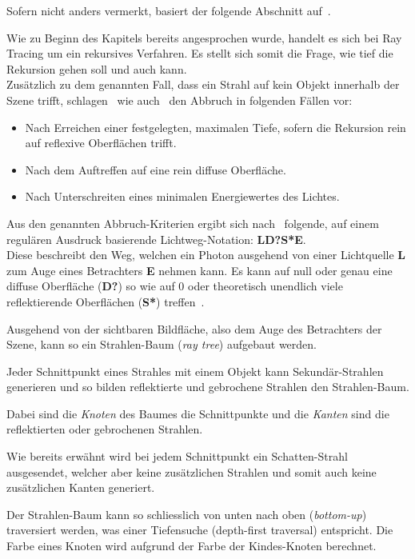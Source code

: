 Sofern nicht anders vermerkt, basiert der folgende Abschnitt
auf~\cite[S. 16 bis 17]{glassner_introduction_1989}.

Wie zu Beginn des Kapitels bereits angesprochen wurde, handelt es sich
bei Ray Tracing um ein rekursives Verfahren. Es stellt sich somit die
Frage, wie tief die Rekursion gehen soll und auch kann.\\
Zusätzlich zu dem genannten Fall, dass ein Strahl auf kein Objekt
innerhalb der Szene trifft, schlagen~\citeauthor{whitted_improved_1980}
wie auch~\citeauthor{glassner_introduction_1989} den Abbruch in
folgenden Fällen vor:
\begin{itemize}
        \item{Nach Erreichen einer festgelegten, maximalen Tiefe},
            sofern die Rekursion rein auf reflexive Oberflächen trifft.
        \item{Nach dem Auftreffen auf eine rein diffuse Oberfläche.}
        \item{Nach Unterschreiten eines minimalen Energiewertes des
                Lichtes.}
\end{itemize}

Aus den genannten Abbruch-Kriterien ergibt sich
nach~\citeauthor{heckbert_adaptive_1990} folgende, auf einem regulären
Ausdruck basierende Lichtweg-Notation: \textbf{LD?S*E}.\\
Diese beschreibt den Weg, welchen ein Photon ausgehend von einer
Lichtquelle \textbf{L} zum Auge eines Betrachters \textbf{E} nehmen
kann. Es kann auf null oder genau eine diffuse Oberfläche (\textbf{D?})
so wie auf 0 oder theoretisch unendlich viele reflektierende Oberflächen
(\textbf{S*}) treffen~\parencite[S. 148]{heckbert_adaptive_1990}.

Ausgehend von der sichtbaren Bildfläche, also dem Auge des Betrachters
der Szene, kann so ein Strahlen-Baum (\textit{ray tree}) aufgebaut
werden.

Jeder Schnittpunkt eines Strahles mit einem Objekt kann
Sekundär-Strahlen generieren und so bilden reflektierte und gebrochene
Strahlen den Strahlen-Baum.

Dabei sind die \textit{Knoten} des Baumes die Schnittpunkte und die
\textit{Kanten} sind die reflektierten oder gebrochenen Strahlen.

Wie bereits erwähnt wird bei jedem Schnittpunkt ein Schatten-Strahl
ausgesendet, welcher aber keine zusätzlichen Strahlen und somit auch
keine zusätzlichen Kanten generiert.

Der Strahlen-Baum kann so schliesslich von unten nach oben
(\textit{bottom-up}) traversiert werden, was einer Tiefensuche
(depth-first traversal) entspricht. Die Farbe eines Knoten wird aufgrund
der Farbe der Kindes-Knoten berechnet.


